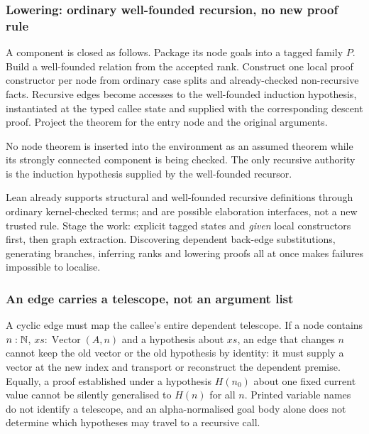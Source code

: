 \subsubsection*{Lowering: ordinary well-founded recursion, no new proof rule}

A component is closed as follows. Package its node goals into a tagged family
$P$. Build a well-founded relation from the accepted rank. Construct one local
proof constructor per node from ordinary case splits and already-checked
non-recursive facts. Recursive edges become accesses to the well-founded
induction hypothesis, instantiated at the typed callee state and supplied with
the corresponding descent proof. Project the theorem for the entry node and the
original arguments.

\begin{invariant}\label{inv:scc}
No node theorem is inserted into the environment as an assumed theorem while its
strongly connected component is being checked. The only recursive authority is
the induction hypothesis supplied by the well-founded recursor.
\end{invariant}

Lean already supports structural and well-founded recursive definitions through
ordinary kernel-checked terms;  and 
are possible elaboration interfaces, not a new trusted rule. Stage the work:
explicit tagged states and \emph{given} local constructors first, then graph
extraction. Discovering dependent back-edge substitutions, generating branches,
inferring ranks and lowering proofs all at once makes failures impossible to
localise.

\subsubsection*{An edge carries a telescope, not an argument list}

A cyclic edge must map the callee's entire dependent telescope. If a node
contains $n:\mathbb{N}$, $xs:\operatorname{Vector}(A,n)$ and a hypothesis about $xs$,
an edge that changes $n$ cannot keep the old vector or the old hypothesis by
identity: it must supply a vector at the new index and transport or reconstruct
the dependent premise. Equally, a proof established under a hypothesis $H(n_0)$
about one fixed current value cannot be silently generalised to $H(n)$ for all
$n$. Printed variable names do not identify a telescope, and an
alpha-normalised goal body alone does not determine which hypotheses may travel
to a recursive call.


